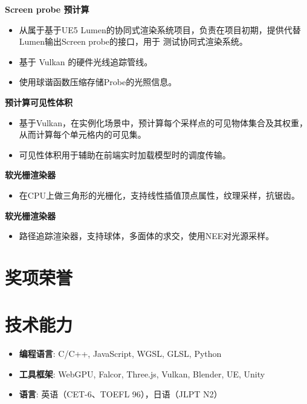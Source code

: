\documentclass{resume}
\begin{document}
\textbf{Screen probe 预计算}
\begin{itemize}
  \item 从属于基于UE5 Lumen的协同式渲染系统项目，负责在项目初期，提供代替Lumen输出Screen probe的接口，用于
  测试协同式渲染系统。
  \item 基于 Vulkan 的硬件光线追踪管线。
  \item 使用球谐函数压缩存储Probe的光照信息。
\end{itemize}

\textbf{预计算可见性体积}
\begin{itemize}
  \item 基于Vulkan，在实例化场景中，预计算每个采样点的可见物体集合及其权重，从而计算每个单元格内的可见集。
  \item 可见性体积用于辅助在前端实时加载模型时的调度传输。
\end{itemize}

\textbf{软光栅渲染器}
\begin{itemize}
  \item 在CPU上做三角形的光栅化，支持线性插值顶点属性，纹理采样，抗锯齿。
\end{itemize}

\textbf{软光栅渲染器}
\begin{itemize}
  \item 路径追踪渲染器，支持球体，多面体的求交，使用NEE对光源采样。
\end{itemize}

\section{奖项荣誉}
\vspace{12pt}
\section{技术能力}
\begin{itemize}[parsep=0.2ex]
  \item \textbf{编程语言}: C/C++, JavaScript, WGSL, GLSL, Python
  \item \textbf{工具框架}: WebGPU, Falcor, Three.js, Vulkan, Blender, UE, Unity
  \item \textbf{语言}: 英语（CET-6、TOEFL 96），日语（JLPT N2）
\end{itemize}
\end{document}
